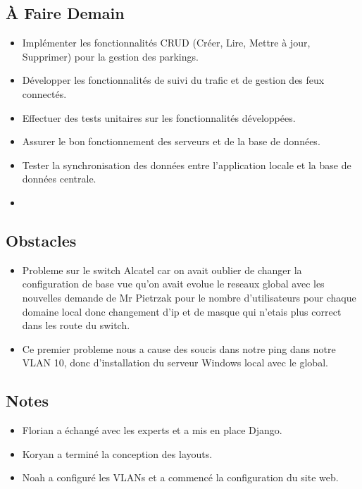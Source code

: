 \documentclass[a4paper,12pt]{report}
\begin{document}
\subsection{À Faire Demain}
\begin{itemize}
    \item Implémenter les fonctionnalités CRUD (Créer, Lire, Mettre à jour, Supprimer) pour la gestion des parkings.
    \item Développer les fonctionnalités de suivi du trafic et de gestion des feux connectés.
    \item Effectuer des tests unitaires sur les fonctionnalités développées.
    \item Assurer le bon fonctionnement des serveurs et de la base de données.
    \item Tester la synchronisation des données entre l'application locale et la base de données centrale.
    \item 
\end{itemize}

\subsection{Obstacles}

\begin{itemize}
    \item Probleme sur le switch Alcatel car on avait oublier de changer la configuration de base vue qu'on avait evolue le reseaux global avec les nouvelles demande de Mr Pietrzak pour le nombre d'utilisateurs pour chaque domaine local donc changement d'ip et de masque qui n'etais plus correct dans les route du switch.
    \item Ce premier probleme nous a cause des soucis dans notre ping dans notre VLAN 10, donc d'installation du serveur Windows local avec le global.
\end{itemize}

\subsection{Notes}
\begin{itemize}
    \item Florian a échangé avec les experts et a mis en place Django.
    \item Koryan a terminé la conception des layouts.
    \item Noah a configuré les VLANs et a commencé la configuration du site web.
\end{itemize}
\end{document}
